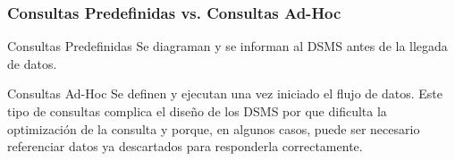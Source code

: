 \begin{frame}
\frametitle{Consultas Predefinidas vs. Consultas Ad-Hoc}
\begin{block}{Consultas Predefinidas}
Se diagraman y se informan al DSMS antes de la llegada de datos.
\end{block}

\begin{block}{Consultas Ad-Hoc}
Se definen y ejecutan una vez iniciado el flujo de datos. Este tipo de consultas complica el diseño de los DSMS por que dificulta la optimización de la consulta y porque, en algunos casos, puede ser necesario referenciar datos ya descartados para responderla correctamente.
\end{block}
\end{frame}


